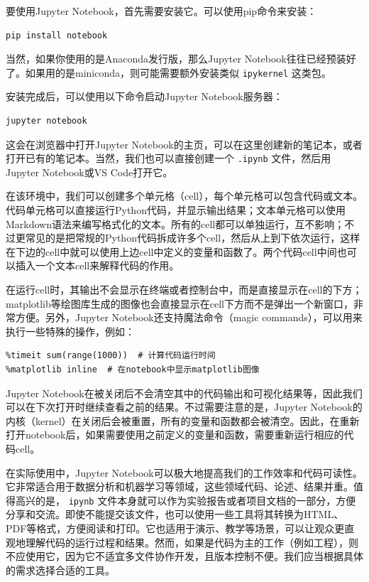 要使用Jupyter Notebook，首先需要安装它。可以使用pip命令来安装：
\begin{verbatim}
pip install notebook
\end{verbatim}
当然，如果你使用的是Anaconda发行版，那么Jupyter Notebook往往已经预装好了。如果用的是miniconda，则可能需要额外安装类似 \texttt{ipykernel} 这类包。

安装完成后，可以使用以下命令启动Jupyter Notebook服务器：
\begin{verbatim}
jupyter notebook
\end{verbatim}
这会在浏览器中打开Jupyter Notebook的主页，可以在这里创建新的笔记本，或者打开已有的笔记本。当然，我们也可以直接创建一个 \texttt{.ipynb} 文件，然后用Jupyter Notebook或VS Code打开它。

在该环境中，我们可以创建多个单元格（cell），每个单元格可以包含代码或文本。代码单元格可以直接运行Python代码，并显示输出结果；文本单元格可以使用Markdown语法来编写格式化的文本。所有的cell都可以单独运行，互不影响；不过更常见的是把常规的Python代码拆成许多个cell，然后从上到下依次运行，这样在下边的cell中就可以使用上边cell中定义的变量和函数了。两个代码cell中间也可以插入一个文本cell来解释代码的作用。

在运行cell时，其输出不会显示在终端或者控制台中，而是直接显示在cell的下方；matplotlib等绘图库生成的图像也会直接显示在cell下方而不是弹出一个新窗口，非常方便。另外，Jupyter Notebook还支持魔法命令（magic commands），可以用来执行一些特殊的操作，例如：
\begin{verbatim}
%timeit sum(range(1000))  # 计算代码运行时间
%matplotlib inline  # 在notebook中显示matplotlib图像
\end{verbatim}

Jupyter Notebook在被关闭后不会清空其中的代码输出和可视化结果等，因此我们可以在下次打开时继续查看之前的结果。不过需要注意的是，Jupyter Notebook的内核（kernel）在关闭后会被重置，所有的变量和函数都会被清空。因此，在重新打开notebook后，如果需要使用之前定义的变量和函数，需要重新运行相应的代码cell。

在实际使用中，Jupyter Notebook可以极大地提高我们的工作效率和代码可读性。它非常适合用于数据分析和机器学习等领域，这些领域代码、论述、结果并重。值得高兴的是， \texttt{ipynb} 文件本身就可以作为实验报告或者项目文档的一部分，方便分享和交流。即使不能提交该文件，也可以使用一些工具将其转换为HTML、PDF等格式，方便阅读和打印。它也适用于演示、教学等场景，可以让观众更直观地理解代码的运行过程和结果。然而，如果是代码为主的工作（例如工程），则不应使用它，因为它不适宜多文件协作开发，且版本控制不便。我们应当根据具体的需求选择合适的工具。
